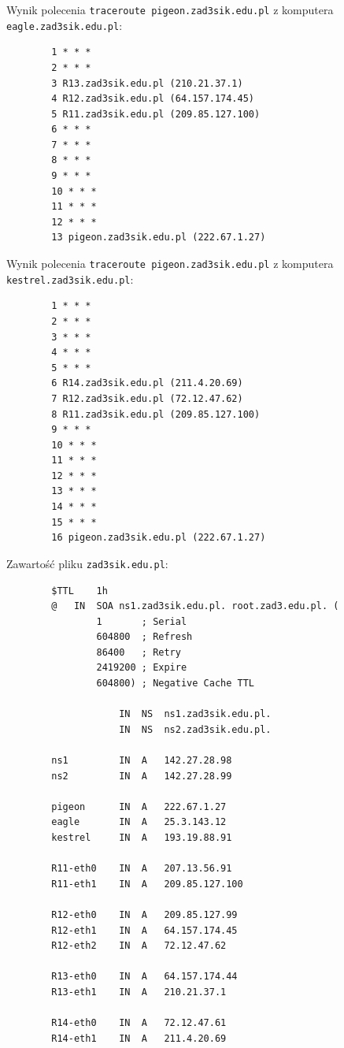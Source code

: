 \documentclass[12pt]{article}
\begin{document}
	\medskip
	
	Wynik polecenia \texttt{traceroute pigeon.zad3sik.edu.pl} z komputera
	\texttt{eagle.zad3sik.edu.pl}:
	\begin{verbatim}
		1 * * *
		2 * * *
		3 R13.zad3sik.edu.pl (210.21.37.1)
		4 R12.zad3sik.edu.pl (64.157.174.45)
		5 R11.zad3sik.edu.pl (209.85.127.100)
		6 * * *
		7 * * *
		8 * * *
		9 * * *
		10 * * *
		11 * * *
		12 * * *
		13 pigeon.zad3sik.edu.pl (222.67.1.27)
	\end{verbatim}
	
	\medskip
	
	Wynik polecenia \texttt{traceroute pigeon.zad3sik.edu.pl} z komputera
	\texttt{kestrel.zad3sik.edu.pl}:
	\begin{verbatim}
		1 * * *
		2 * * *
		3 * * *
		4 * * *
		5 * * *
		6 R14.zad3sik.edu.pl (211.4.20.69)
		7 R12.zad3sik.edu.pl (72.12.47.62)
		8 R11.zad3sik.edu.pl (209.85.127.100)
		9 * * *
		10 * * *
		11 * * *
		12 * * *
		13 * * *
		14 * * *
		15 * * *
		16 pigeon.zad3sik.edu.pl (222.67.1.27)
	\end{verbatim}
	
	\medskip
	
	Zawartość pliku \texttt{zad3sik.edu.pl}:
	\begin{verbatim}
		$TTL    1h
		@   IN  SOA ns1.zad3sik.edu.pl. root.zad3.edu.pl. (
		        1       ; Serial
		        604800  ; Refresh
		        86400   ; Retry
		        2419200 ; Expire
		        604800) ; Negative Cache TTL
		
		            IN  NS  ns1.zad3sik.edu.pl.
		            IN  NS  ns2.zad3sik.edu.pl.
		
		ns1         IN  A   142.27.28.98
		ns2         IN  A   142.27.28.99
		
		pigeon      IN  A   222.67.1.27
		eagle       IN  A   25.3.143.12
		kestrel     IN  A   193.19.88.91
		
		R11-eth0    IN  A   207.13.56.91
		R11-eth1    IN  A   209.85.127.100
		
		R12-eth0    IN  A   209.85.127.99
		R12-eth1    IN  A   64.157.174.45
		R12-eth2    IN  A   72.12.47.62
		
		R13-eth0    IN  A   64.157.174.44
		R13-eth1    IN  A   210.21.37.1
		
		R14-eth0    IN  A   72.12.47.61
		R14-eth1    IN  A   211.4.20.69
	\end{verbatim}
\end{document}
